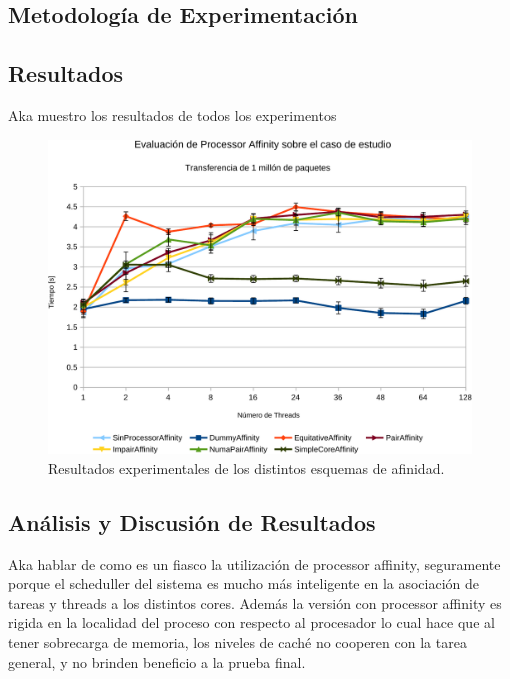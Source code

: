 \subsection{Metodología de Experimentación}

\subsection{Resultados}

Aka muestro los resultados de todos los experimentos
\begin{figure}[!h]
	\centering
	\includegraphics[scale=.6]{resultados/processoraffinity-crop.pdf}
	\caption{Resultados experimentales de los distintos esquemas de afinidad.}
	\label{fig:resAffinity}
\end{figure}

\subsection{Análisis y Discusión de Resultados}
Aka hablar de como es un fiasco la utilización de processor affinity, seguramente porque el scheduller del sistema es mucho más inteligente en la asociación de tareas y threads a los distintos cores. Además la versión con processor affinity es rigida en la localidad del proceso con respecto al procesador lo cual hace que al tener sobrecarga de memoria, los niveles de caché no cooperen con la tarea general, y no brinden beneficio a la prueba final.

